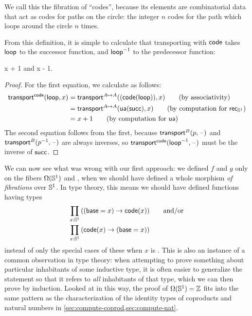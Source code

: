We call this the fibration of ``codes'', because its elements are combinatorial data that act as codes for paths on the circle: the integer $n$ codes for the path which loops around the circle $n$ times.

From this definition, it is simple to calculate that transporting with
$\mathsf{code}$ takes $\mathsf{loop}$ to the successor function, and 
$\mathord{{\mathsf{loop}}^{-1}}$ to the predecessor function:
\begin{lem} \label{lem:transport-s1-code}
 {x + 1} and 
 {x - 1}.
\end{lem}
\begin{proof}
For the first equation, we calculate as follows:
\begin{align}
{\transfib \code \lloop x} 
&= \transfib {A \mapsto A} {(\ap{\code}{\lloop})} x \tag{by associativity}\\
&= \transfib {A \mapsto A} {\ua (\Zsuc)} x \tag{by computation for $\rec{\Sn^1}$}\\
&= x + 1 \tag{by computation for \ua}
\end{align}
The second equation follows from the first, because $\mathsf{transport}^{B}(p,\mathord{\hspace{1pt}\text{--}\hspace{1pt}})$ and $\mathsf{transport}^{B}(\mathord{{p}^{-1}},\mathord{\hspace{1pt}\text{--}\hspace{1pt}})$ are always inverses, so $\mathsf{transport}^{\mathsf{code}}(\mathord{{\mathsf{loop}}^{-1}},\mathord{\hspace{1pt}\text{--}\hspace{1pt}})$ must be the inverse of $\mathsf{succ}$.
\end{proof}

We can now see what was wrong with our first approach: we defined $f$ and $g$ only on the fibers $\Omega(\mathbb{S}^1)$ and \Z, when we should have defined a whole morphism \emph{of fibrations} over $\mathbb{S}^1$.
In type theory, this means we should have defined functions having types
\begin{align}
  \prd{x:\Sn^1} &((\base=x) \to \code(x)) \qquad\text{and/or} \label{eq:pi1s1-encode}\\
  \prd{x:\Sn^1} &(\code(x) \to (\base=x))\label{eq:pi1s1-decode}
\end{align}
instead of only the special cases of these when $x$ is \base.
This is also an instance of a common observation in type theory: when attempting to prove something about particular inhabitants of some inductive type, it is often easier to generalize the statement so that it refers to \emph{all} inhabitants of that type, which we can then prove by induction.
Looked at in this way, the proof of $\Omega(\mathbb{S}^1)=\mathbb{Z}$ fits into the same pattern as the characterization of the identity types of coproducts and natural numbers in \autoref{sec:compute-coprod,sec:compute-nat}.

